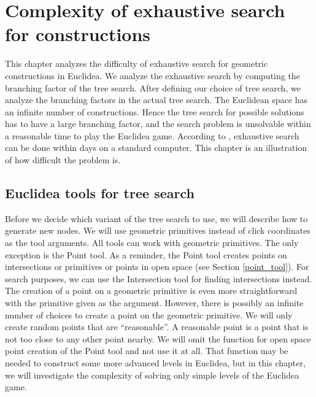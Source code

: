 \chapter{Complexity of exhaustive search for constructions}
\label{chapter_exhaustive_search}This chapter analyzes the difficulty of exhaustive search for geometric constructions in Euclidea. We analyze the exhaustive search by computing the branching factor of the tree search. After defining our choice of tree search, we analyze the branching factors in the actual tree search.
\newline \newline
The Euclidean space has an infinite number of constructions. Hence the tree search for possible solutions has to have a large branching factor, and the search problem is unsolvable within a reasonable time to play the Euclidea game.
According to \cite{ancient_problem}, exhaustive search can be done within days on a standard computer. This chapter is an illustration of how difficult the problem is.

\section{Euclidea tools for tree search}
\label{tools_for_treesearch}
Before we decide which variant of the tree search to use, we will describe how to generate new nodes. We will use geometric primitives instead of click coordinates as the tool arguments. All tools can work with geometric primitives. The only exception is the Point tool. As a reminder, the Point tool creates points on intersections or primitives or points in open space (see Section \ref{point_tool}). For search purposes, we can use the Intersection tool for finding intersections instead. The creation of a point on a geometric primitive is even more straightforward with the primitive given as the argument. However, there is possibly an infinite number of choices to create a point on the geometric primitive. We will only create random points that are ``reasonable''. A reasonable point is a point that is not too close to any other point nearby. We will omit the function for open space point creation of the Point tool and not use it at all. That function may be needed to construct some more advanced levels in Euclidea, but in this chapter, we will investigate the complexity of solving only simple levels of the Euclidea game.

